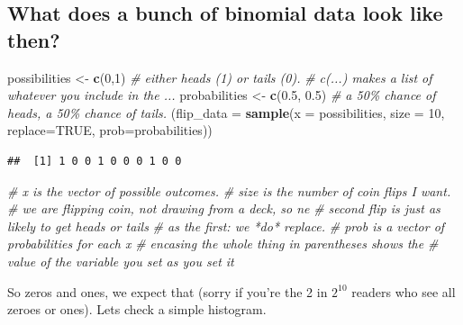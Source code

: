 \documentclass[
]{book}
\newenvironment{Shaded}{\begin{snugshade}}{\end{snugshade}}
\newcommand{\CommentTok}[1]{\textcolor[rgb]{0.56,0.35,0.01}{\textit{#1}}}
\newcommand{\DataTypeTok}[1]{\textcolor[rgb]{0.13,0.29,0.53}{#1}}
\newcommand{\DecValTok}[1]{\textcolor[rgb]{0.00,0.00,0.81}{#1}}
\newcommand{\FloatTok}[1]{\textcolor[rgb]{0.00,0.00,0.81}{#1}}
\newcommand{\KeywordTok}[1]{\textcolor[rgb]{0.13,0.29,0.53}{\textbf{#1}}}
\newcommand{\NormalTok}[1]{#1}
\newcommand{\OtherTok}[1]{\textcolor[rgb]{0.56,0.35,0.01}{#1}}
\newcommand{\StringTok}[1]{\textcolor[rgb]{0.31,0.60,0.02}{#1}}
\begin{document}
\hypertarget{what-does-a-bunch-of-binomial-data-look-like-then}{%
\subsection{What does a bunch of binomial data look like then?}\label{what-does-a-bunch-of-binomial-data-look-like-then}}

\begin{Shaded}
\begin{Highlighting}[]
\NormalTok{possibilities \textless{}{-}}\StringTok{ }\KeywordTok{c}\NormalTok{(}\DecValTok{0}\NormalTok{,}\DecValTok{1}\NormalTok{) }\CommentTok{\# either heads (1) or tails (0).}
                        \CommentTok{\# c(...) makes a list of whatever you include in the ...}
\NormalTok{probabilities \textless{}{-}}\StringTok{ }\KeywordTok{c}\NormalTok{(}\FloatTok{0.5}\NormalTok{, }\FloatTok{0.5}\NormalTok{)}
                        \CommentTok{\# a 50\% chance of heads, a 50\% chance of tails.}
\NormalTok{(}\DataTypeTok{flip\_data =} \KeywordTok{sample}\NormalTok{(}\DataTypeTok{x =}\NormalTok{ possibilities, }\DataTypeTok{size =} \DecValTok{10}\NormalTok{, }\DataTypeTok{replace=}\OtherTok{TRUE}\NormalTok{, }\DataTypeTok{prob=}\NormalTok{probabilities))}
\end{Highlighting}
\end{Shaded}

\begin{verbatim}
##  [1] 1 0 0 1 0 0 0 1 0 0
\end{verbatim}

\begin{Shaded}
\begin{Highlighting}[]
                        \CommentTok{\# x is the vector of possible outcomes.}
                        \CommentTok{\# size is the number of coin flips I want.}
                        \CommentTok{\# we are flipping coin, not drawing from a deck, so ne}
                        \CommentTok{\#   second flip is just as likely to get heads or tails}
                        \CommentTok{\#   as the first: we *do* replace.}
                        \CommentTok{\# prob is a vector of probabilities for each x}
                        \CommentTok{\# encasing the whole thing in parentheses shows the}
                        \CommentTok{\#   value of the variable you set as you set it}
\end{Highlighting}
\end{Shaded}

So zeros and ones, we expect that (sorry if you're the 2 in \(2^{10}\) readers who see all zeroes or ones). Lets check a simple histogram.
\end{document}

